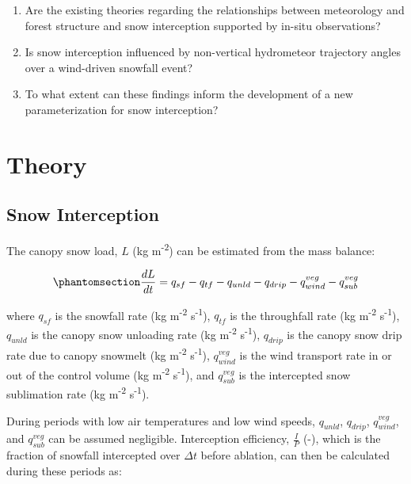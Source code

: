 \documentclass[
  letterpaper,
  DIV=11,
  numbers=noendperiod]{scrartcl}
\begin{document}
\begin{enumerate}
\def\labelenumi{\arabic{enumi}.}
\item
  Are the existing theories regarding the relationships between
  meteorology and forest structure and snow interception supported by
  in-situ observations?
\item
  Is snow interception influenced by non-vertical hydrometeor trajectory
  angles over a wind-driven snowfall event?
\item
  To what extent can these findings inform the development of a new
  parameterization for snow interception?
\end{enumerate}

\section{Theory}\label{theory}

\subsection{Snow Interception}\label{snow-interception}

The canopy snow load, \(L\) (kg m\textsuperscript{-2}) can be estimated
from the mass balance:

\begin{equation}\phantomsection\label{eq-canopy-mass-bal}{
\frac{dL}{dt} = 
q_{sf} - q_{tf} - q_{unld} - q_{drip} - q_{wind}^{veg} - q_{sub}^{veg}
}\end{equation}

where \(q_{sf}\) is the snowfall rate (kg m\textsuperscript{-2}
s\textsuperscript{-1}), \(q_{tf}\) is the throughfall rate (kg
m\textsuperscript{-2} s\textsuperscript{-1}), \(q_{unld}\) is the canopy
snow unloading rate (kg m\textsuperscript{-2} s\textsuperscript{-1}),
\(q_{drip}\) is the canopy snow drip rate due to canopy snowmelt (kg
m\textsuperscript{-2} s\textsuperscript{-1}), \(q_{wind}^{veg}\) is the
wind transport rate in or out of the control volume (kg
m\textsuperscript{-2} s\textsuperscript{-1}), and \(q_{sub}^{veg}\) is
the intercepted snow sublimation rate (kg m\textsuperscript{-2}
s\textsuperscript{-1}).

During periods with low air temperatures and low wind speeds,
\(q_{unld}\), \(q_{drip}\), \(q_{wind}^{veg}\), and \(q_{sub}^{veg}\)
can be assumed negligible. Interception efficiency, \(\frac{I}{P}\) (-),
which is the fraction of snowfall intercepted over \(\Delta t\) before
ablation, can then be calculated during these periods as:
\end{document}
